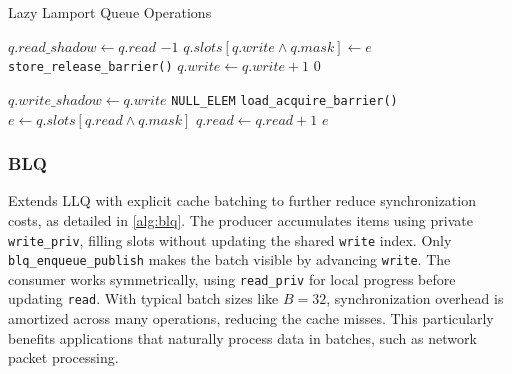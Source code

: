 \begin{algorithm}[!ht]
   \centering
   \captionsetup{justification=centering}
   \caption{Lazy Lamport Queue Operations \cite{MaffioneCacheAware}}
   \label{alg:llq}
   \scriptsize
   \begin{algorithmic}[1]
            
               \State $q.read\_shadow \gets q.read$ 
                   \State \Return $-1$ 
               \EndIf
           \EndIf
           \State $q.slots[q.write \land q.mask] \gets e$
           \State \texttt{store\_release\_barrier()}
           \State $q.write \gets q.write + 1$
           \State \Return $0$
       \EndFunction
       
       \State
       
            
               \State $q.write\_shadow \gets q.write$ 
                   \State \Return \texttt{NULL\_ELEM}
               \EndIf
           \EndIf
           \State \texttt{load\_acquire\_barrier()}
           \State $e \gets q.slots[q.read \land q.mask]$
           \State $q.read \gets q.read + 1$
           \State \Return $e$
       \EndFunction
   \end{algorithmic}
\end{algorithm}

\subsubsection{\acf{BLQ}}
Extends LLQ with explicit cache batching to further reduce synchronization costs, as detailed in \cref{alg:blq}. The producer accumulates items using private \texttt{write\_priv}, filling slots without updating the shared \texttt{write} index. Only \texttt{blq\_enqueue\_publish} makes the batch visible by advancing \texttt{write}. The consumer works symmetrically, using \texttt{read\_priv} for local progress before updating \texttt{read}. With typical batch sizes like $B = 32$, synchronization overhead is amortized across many operations, reducing the cache misses. This particularly benefits applications that naturally process data in batches, such as network packet processing. \cite{MaffioneCacheAware}

